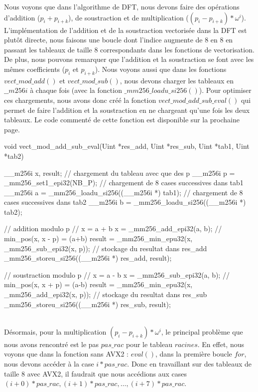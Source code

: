 \documentclass[12pt, a4paper]{article}
\begin{document}
Nous voyons que dans l'algorithme de DFT, nous devons faire des opérations d'addition ($p_i+p_{i+k}$), de soustraction et de multiplication ($(p_i-p_{i+k})*\omega^i$). \\
L'implémentation de l'addition et de la soustraction vectorisée dans la DFT est plutôt directe, nous faisons une boucle dont l'indice augmente de 8 en 8 en passant les tableaux de taille 8 correspondants dans les fonctions de vectorisation. \\
\indent De plus, nous pouvons remarquer que l'addition et la soustraction se font avec les mêmes coefficients ($p_i$ et $p_{i+k}$). Nous voyons aussi que dans les fonctions $vect\_mod\_add()$ et \linebreak $vect\_mod\_sub()$, nous devons charger les tableaux en $\_\_m256i$ à chaque fois (avec la fonction $\_mm256\_loadu\_si256()$). Pour optimiser ces chargements, nous avons donc créé la fonction \linebreak $vect\_mod\_add\_sub\_eval()$ qui permet de faire l'addition et la soustraction en ne chargeant qu'une fois les deux tableaux. Le code commenté de cette fonction est disponible sur la prochaine page. \newpage
\begin{customFrame}
void vect_mod_add_sub_eval(Uint *res_add, Uint *res_sub, Uint *tab1, 
													 Uint *tab2) {
    __m256i x, result; 
    // chargement du tableau avec que des p
    __m256i p = _mm256_set1_epi32(NB_P); 
    // chargement de 8 cases successives dans tab1
    __m256i a = _mm256_loadu_si256((__m256i *) tab1); 
    // chargement de 8 cases successives dans tab2
    __m256i b = _mm256_loadu_si256((__m256i *) tab2); 

    // addition modulo p
    // x = a + b
    x = _mm256_add_epi32(a, b); 
    // min_pos(x, x - p) = (a+b)%
    result = _mm256_min_epu32(x, _mm256_sub_epi32(x, p)); 
    // stockage du resultat dans res_add
    _mm256_storeu_si256((__m256i *) res_add, result);

    // soustraction modulo p
    // x = a - b
    x = _mm256_sub_epi32(a, b);
    // min_pos(x, x + p) = (a-b)%
    result = _mm256_min_epu32(x, _mm256_add_epi32(x, p)); 
    // stockage du resultat dans res_sub
    _mm256_storeu_si256((__m256i *) res_sub, result);
}
\end{customFrame}
\ \\
\indent Désormais, pour la multiplication $(p_i-p_{i+k})*\omega^i$, le principal problème que nous avons rencontré est le pas $pas\_rac$ pour le tableau $racines$. En effet, nous voyons que dans la fonction sans AVX2 : $eval()$, dans la première boucle $for$, nous devons accéder à la case $i*pas\_rac$. Donc en travaillant sur des tableaux de taille 8 avec AVX2, il faudrait que nous accédions aux cases $(i+0)*pas\_rac,(i+1)*pas\_rac,\dots,(i+7)*pas\_rac$. 
\end{document}
